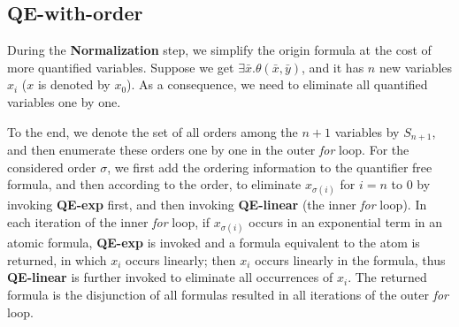 \documentclass[runningheads]{llncs}
\begin{document}
\subsection{QE-with-order} 
During the \textbf{Normalization} step, 
we simplify the origin formula at the cost of more quantified variables. 
Suppose we get $\exists \bar{x}.\theta(\bar{x},\bar{y})$,
and it has $n$ new variables $x_i$ ($x$ is denoted by $x_0$).
As a consequence, we need to eliminate all quantified variables one by one. 

To the end, we denote the set of all orders among the $n+1$ variables by 
 $S_{n+1}$, and then enumerate these orders one by one in the outer \textit{for} loop. 
 For the considered order $\sigma$, we first add the ordering information to 
 the quantifier free formula, and then according to the 
 order, to eliminate $x_{\sigma(i)}$ for $i=n$ to $0$ by invoking \textbf{QE-exp} first, and then invoking \textbf{QE-linear} (the inner \textit{for} loop). 
 In each iteration of the inner \textit{for} loop, 
if $x_{\sigma{(i)}}$ occurs in an exponential term in an atomic formula, 
\textbf{QE-exp} is invoked and a formula   equivalent to the atom is returned, in which $x_i$ occurs linearly;  
then $x_i$ occurs linearly in the formula, thus \textbf{QE-linear} is further invoked to eliminate all occurrences of $x_i$. 
The returned formula is the disjunction of all formulas resulted in all iterations of the outer \textit{for} loop. 
 
 
 
\iffalse
put , We now specify an order of $\bar{x}$, and recursively eliminate the maximal element in the remaining $\bar{x}$. 
That is to say,
every execution of \textbf{QE-exp} and \textbf{QE-linear} will eliminate the largest element $x_i$ in $\bar{x}$.
However, as you may notice, if there is no clue about the order of $\bar{x}$, 
we will have to use the idea of permutation group and the number of sub-cases will blow up, in the worst case, $(n+1)!$ cases. 

Here is how \textbf{QE-exp} and \textbf{QE-linear} are invoked in
\textbf{Ordering and QE}. 
\fi

\end{document}
